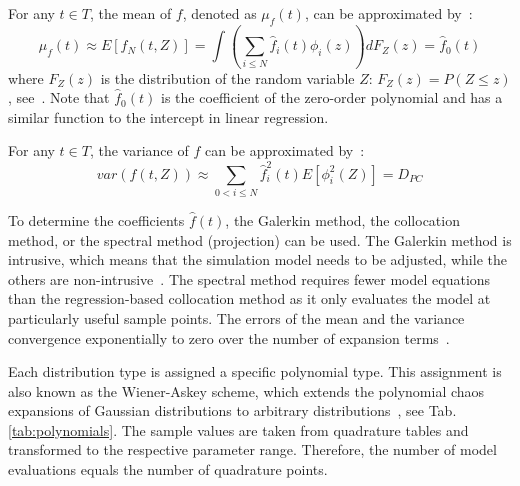 For any $t \in T$, the mean of $f$, denoted as $\mu_f(t)$, can be approximated by~\cite[p.67]{xiu-2010-math}:
\begin{equation}
\mu_f(t) \approx E[f_N(t,Z)] = \int \left(  \sum_{i \leq N}  \hat{f}_i(t) \phi_{i}(z)    \right) d F_Z(z) = \hat{f}_0(t)
\label{eq:meanpoly}
\end{equation}
where $F_Z(z)$ is the distribution of the random variable $Z$: $F_Z(z)=P(Z\leq z)$, see~\cite[p.64]{xiu-2010-math}.
Note that $\hat{f}_0(t)$ is the coefficient of the zero-order polynomial and has a similar function to the intercept in linear regression.

For any $t \in T$, the variance of $f$ can be approximated by~\cite[p.67]{xiu-2010-math}:
\begin{equation}
var(f(t,Z)) \approx \sum_{0  < i \leq N}  \hat{f}_i^2(t)    E[\phi_i^2(Z)]  = D_{PC}
\label{eq:varpoly}
\end{equation}

To determine the coefficients $\hat{f}(t)$, the Galerkin method, the collocation method, or the spectral method (projection) can be used. The Galerkin method is intrusive, which means that the simulation model needs to be adjusted, while the others are non-intrusive~\cite{smith-2014-math}. The spectral method requires fewer model equations than the regression-based collocation method as it only evaluates the model at particularly useful sample points. The errors of the mean and the variance convergence exponentially to zero over the number of expansion terms~\cite{xiu-2002-math}.

Each distribution type is assigned a specific polynomial type. This assignment is also known as the Wiener-Askey scheme, which extends the polynomial chaos expansions of Gaussian distributions to arbitrary distributions~\cite{xiu-2002-math}, see Tab. \ref{tab:polynomials}. The sample values are taken from quadrature tables and transformed to the respective parameter range. Therefore, the number of model evaluations equals the number of quadrature points.



